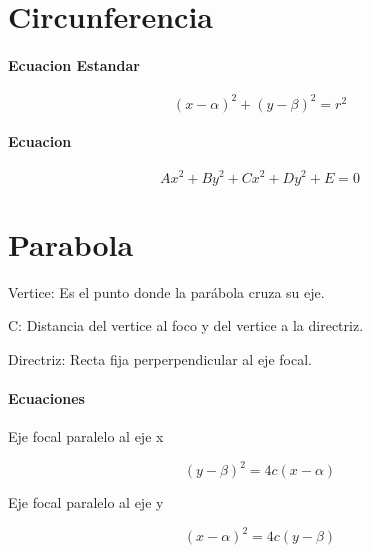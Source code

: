 \documentclass[a4paper]{article}
\begin{document}
\section{Circunferencia}

\paragraph{Ecuacion Estandar}
	\begin{equation}
		(x -\alpha)^{2} + (y - \beta)^{2} = r^{2}
	\end{equation}

\paragraph{Ecuacion} 
	\begin{equation}
		A x^{2}+ B y^{2} + C x^{2} +D y^{2} + E = 0
	\end{equation} 

\section{Parabola}
\begin{description}
	\item Vertice: Es el punto donde la parábola cruza su eje.

	\item C: Distancia del vertice al foco y del vertice a la directriz.

	\item Directriz: Recta fija perperpendicular al eje focal.

\end{description}
 

\paragraph{Ecuaciones}
\begin{description}
	\item Eje focal paralelo al eje x
\end{description}	
	\begin{equation}
		(y - \beta)^{2}= 4c(x - \alpha)
	\end{equation}
\begin{description}
	\item Eje focal paralelo al eje y
\end{description}
		\begin{equation}
		(x - \alpha)^{2}=4c(y - \beta)
	\end{equation}
\end{document}
